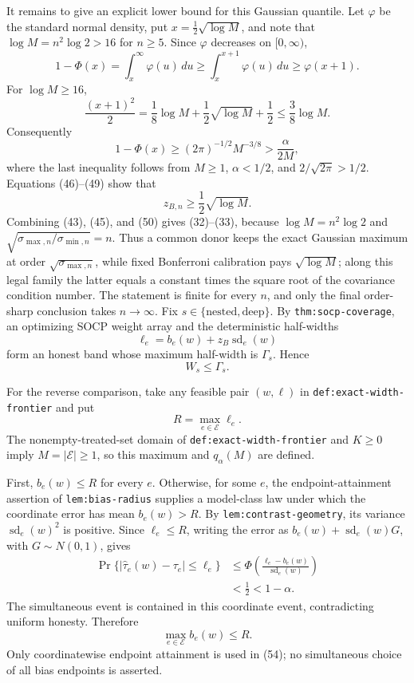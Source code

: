 It remains to give an explicit lower bound for this Gaussian quantile.  Let
\(\varphi\) be the standard normal density, put
\(x=\tfrac12\sqrt{\log M}\), and note that
\(\log M=n^2\log2>16\) for \(n\geq5\).  Since \(\varphi\) decreases on
\([0,\infty)\),
\[
 1-\Phi(x)=\int_x^\infty\varphi(u)\,du
 \geq\int_x^{x+1}\varphi(u)\,du
 \geq\varphi(x+1). \tag{47}
\]
For \(\log M\geq16\),
\[
 \frac{(x+1)^2}{2}
 =\frac18\log M+\frac12\sqrt{\log M}+\frac12
 \leq\frac38\log M. \tag{48}
\]
Consequently
\[
 1-\Phi(x)
 \geq(2\pi)^{-1/2}M^{-3/8}
 >\frac{\alpha}{2M}, \tag{49}
\]
where the last inequality follows from \(M\geq1\), \(\alpha<1/2\), and
\(2/\sqrt{2\pi}>1/2\).  Equations (46)--(49) show that
\[
 z_{B,n}\geq\frac12\sqrt{\log M}. \tag{50}
\]
Combining (43), (45), and (50) gives (32)--(33), because
\(\log M=n^2\log2\) and
\(\sqrt{\sigma_{\max,n}/\sigma_{\min,n}}=n\).  Thus a common donor keeps the
exact Gaussian maximum at order \(\sqrt{\sigma_{\max,n}}\), while fixed
Bonferroni calibration pays \(\sqrt{\log M}\); along this legal family the
latter equals a constant times the square root of the covariance condition
number.  The statement is finite for every \(n\), and only the final
order-sharp conclusion takes \(n\to\infty\).
Fix \(s\in\{\mathrm{nested},\mathrm{deep}\}\).  By
\texttt{thm:socp-coverage}, an optimizing SOCP weight array and the
deterministic half-widths
\[
 \ell_e=b_e(w)+z_B\operatorname{sd}_e(w) \tag{51}
\]
form an honest band whose maximum half-width is \(\Gamma_s\).  Hence
\[
 W_s\leq\Gamma_s. \tag{52}
\]

For the reverse comparison, take any feasible pair \((w,\ell)\) in
\texttt{def:exact-width-frontier} and put
\[
 R=\max_{e\in\mathcal E}\ell_e. \tag{53}
\]
The nonempty-treated-set domain of \texttt{def:exact-width-frontier} and
\(K\geq0\) imply \(M=|\mathcal E|\geq1\), so this maximum and
\(q_\alpha(M)\) are defined.

First, \(b_e(w)\leq R\) for every \(e\).  Otherwise, for some \(e\), the
endpoint-attainment assertion of \texttt{lem:bias-radius} supplies a
model-class law under which the coordinate error has mean \(b_e(w)>R\).
By \texttt{lem:contrast-geometry}, its variance
\(\operatorname{sd}_e(w)^2\) is positive.  Since \(\ell_e\leq R\), writing
the error as \(b_e(w)+\operatorname{sd}_e(w)G\), with
\(G\sim N(0,1)\), gives
\[
\begin{aligned}
 \Pr\{|\widehat\tau_e(w)-\tau_e|\leq\ell_e\}
 &\leq \Phi\!\left(
 \frac{\ell_e-b_e(w)}{\operatorname{sd}_e(w)}\right)\\
 &<\frac12<1-\alpha.
\end{aligned} \tag{54}
\]
The simultaneous event is contained in this coordinate event, contradicting
uniform honesty.  Therefore
\[
 \max_{e\in\mathcal E}b_e(w)\leq R. \tag{55}
\]
Only coordinatewise endpoint attainment is used in (54); no simultaneous
choice of all bias endpoints is asserted.

